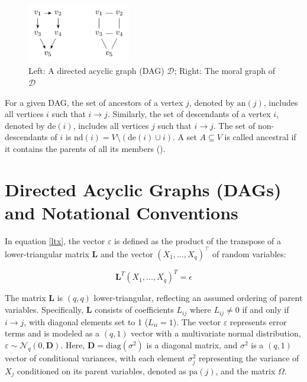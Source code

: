 \documentclass{report}
\begin{document}
\begin{figure}[h] 
	\centering
	\includegraphics[width=0.4\textwidth]{Figures/State_of_art/graph_moralization.png}
	\caption{Left: A directed acyclic graph (DAG) $\mathcal{D}$; Right: The moral graph of $\mathcal{D}$}
	\label{fig:moralization}
\end{figure}

For a given DAG, the set of ancestors of a vertex $j$, denoted by $\text{an}(j)$, includes all vertices $i$ such that $i \rightarrow j$. Similarly, the set of descendants of a vertex $i$, denoted by $\text{de}(i)$, includes all vertices $j$ such that $i \rightarrow j$. The set of non-descendants of $i$ is $\text{nd}(i) = V \setminus (\text{de}(i) \cup {i})$. A set $A \subseteq V$ is called ancestral if it contains the parents of all its members (\citet{ben2015high}). 

\section{Directed Acyclic Graphs (DAGs) and Notational Conventions}

In equation \ref{ltx}, the vector $\varepsilon$ is defined as the product of the transpose of a lower-triangular matrix $\mathbf{L}$ and the vector $(X_1, \ldots, X_q)^\top$ of random variables:

\begin{equation} \label{ltx}
	\mathbf{L}^T(X_1,...,X_q)^T = \epsilon
\end{equation}

The matrix $\mathbf{L}$ is $(q, q)$ lower-triangular, reflecting an assumed ordering of parent variables. Specifically, $\mathbf{L}$ consists of coefficients ${L_{ij}}$ where $L_{ij} \neq 0$ if and only if $i \rightarrow j$, with diagonal elements set to 1 ($L_{ii} = 1$). The vector $\varepsilon$ represents error terms and is modeled as a $(q, 1)$ vector with a multivariate normal distribution, $\varepsilon \sim \mathcal{N}_q(0, \mathbf{D})$. Here, $\mathbf{D} = \text{diag}(\sigma^2)$ is a diagonal matrix, and $\sigma^2$ is a $(q, 1)$ vector of conditional variances, with each element $\sigma_j^2$ representing the variance of $X_j$ conditioned on its parent variables, denoted as $\text{pa}(j)$, and the matrix $\Omega$.
\end{document}
